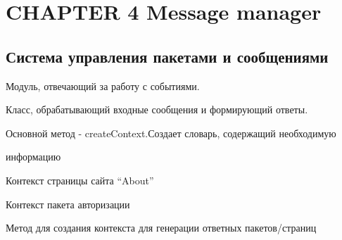\documentclass[letterpaper,10pt,english]{sphinxmanual}
\begin{document}
\chapter{CHAPTER 4 Message manager}
\label{messageManager::doc}\label{messageManager:chapter-4-message-manager}

\section{Система управления пакетами и сообщениями}
\label{messageManager:id1}\label{messageManager:module-mainServer.messageManager}
Модуль, отвечающий за работу с событиями.

\begin{fulllineitems}
\label{messageManager:mainServer.messageManager.MessageManager}
Класс, обрабатывающий входные сообщения и формирующий ответы.

Основной метод - createContext.Создает словарь, содержащий необходимую

информацию

\begin{fulllineitems}
\label{messageManager:mainServer.messageManager.MessageManager.aboutContext}
Контекст страницы сайта ``About''

\end{fulllineitems}


\begin{fulllineitems}
\label{messageManager:mainServer.messageManager.MessageManager.authoriseContext}
Контекст пакета авторизации

\end{fulllineitems}


\begin{fulllineitems}
\label{messageManager:mainServer.messageManager.MessageManager.createContext}
Метод для создания контекста для генерации ответных пакетов/страниц


\end{fulllineitems}
\end{fulllineitems}
\end{document}
